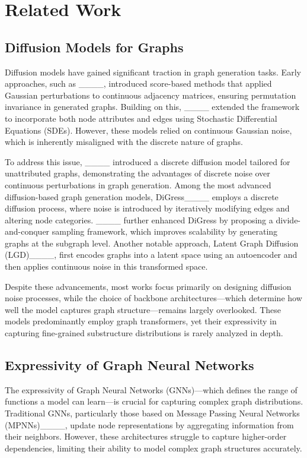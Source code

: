\section{Related Work}
\subsection{Diffusion Models for Graphs}  
Diffusion models have gained significant traction in graph generation tasks. Early approaches, such as ____, introduced score-based methods that applied Gaussian perturbations to continuous adjacency matrices, ensuring permutation invariance in generated graphs. Building on this, ____ extended the framework to incorporate both node attributes and edges using Stochastic Differential Equations (SDEs). However, these models relied on continuous Gaussian noise, which is inherently misaligned with the discrete nature of graphs.  

To address this issue, ____ introduced a discrete diffusion model tailored for unattributed graphs, demonstrating the advantages of discrete noise over continuous perturbations in graph generation. Among the most advanced diffusion-based graph generation models, DiGress____ employs a discrete diffusion process, where noise is introduced by iteratively modifying edges and altering node categories. ____ further enhanced DiGress by proposing a divide-and-conquer sampling framework, which improves scalability by generating graphs at the subgraph level. Another notable approach, Latent Graph Diffusion (LGD)____, first encodes graphs into a latent space using an autoencoder and then applies continuous noise in this transformed space.  

Despite these advancements, most works focus primarily on designing diffusion noise processes, while the choice of backbone architectures—which determine how well the model captures graph structure—remains largely overlooked. These models predominantly employ graph transformers, yet their expressivity in capturing fine-grained substructure distributions is rarely analyzed in depth.

\subsection{Expressivity of Graph Neural Networks}  
The expressivity of Graph Neural Networks (GNNs)—which defines the range of functions a model can learn—is crucial for capturing complex graph distributions. Traditional GNNs, particularly those based on Message Passing Neural Networks (MPNNs)____, update node representations by aggregating information from their neighbors. However, these architectures struggle to capture higher-order dependencies, limiting their ability to model complex graph structures accurately.  


